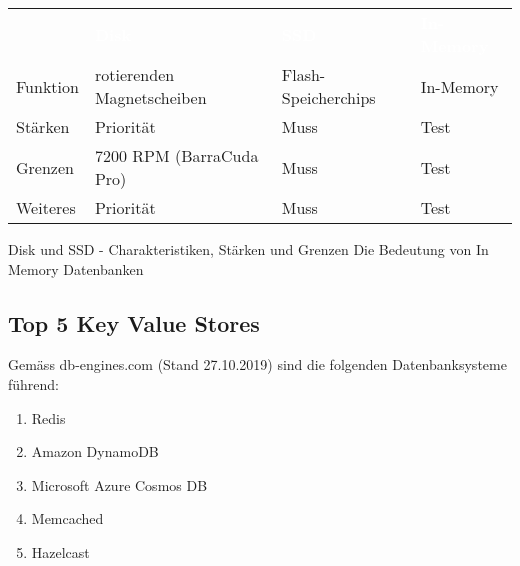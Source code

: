 \begin{table}[H]
	\begin{tabular}{|p{1.6cm}|p{4.6cm}|p{4.6cm}|p{4.6cm}|}
		\hline
		\rowcolor{black}
		&
		\textcolor{white}{\textbf{Disk}} & \textcolor{white}{\textbf{SSD}} &
		\textcolor{white}{\textbf{In-Memory}}
		\\
		Funktion & rotierenden Magnetscheiben & Flash-Speicherchips & In-Memory\\ 
		\hline
		Stärken & Priorität & Muss & Test \\
		\hline
		Grenzen & 7200 RPM (BarraCuda Pro) & Muss & Test \\
		\hline
		Weiteres & Priorität & Muss & Test \\
		\hline 
	\end{tabular}
\end{table}

Disk und SSD - Charakteristiken, Stärken und Grenzen
Die Bedeutung von In Memory Datenbanken

\subsection{Top 5 Key Value Stores}
Gemäss db-engines.com (Stand 27.10.2019) sind die folgenden Datenbanksysteme führend:
\begin{enumerate}
\item Redis
\item Amazon DynamoDB
\item Microsoft Azure Cosmos DB
\item Memcached
\item Hazelcast
\end{enumerate}
